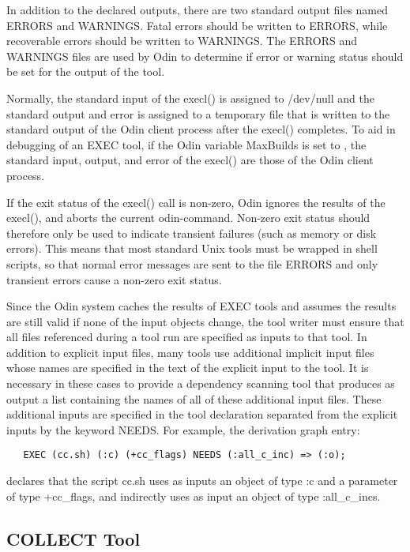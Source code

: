 In addition to the declared outputs,
there are two standard output files named {\ex ERRORS} and {\ex WARNINGS}.
Fatal errors should be written to {\ex ERRORS},
while recoverable errors should be written to {\ex WARNINGS}.
The {\ex ERRORS} and {\ex WARNINGS} files
are used by Odin to determine if error or warning status
should be set for the output of the tool.

Normally, the standard input of the {\ex execl()} is assigned to
{\ex /dev/null} and the standard output and error is assigned to
a temporary file that is written to the standard output of the
Odin client process after the {\ex execl()} completes.
To aid in debugging of an {\ex EXEC} tool,
if the Odin variable {\ex MaxBuilds} is set to {},
the standard input, output, and error of the {\ex execl()}
are those of the Odin client process.

If the exit status of the {\ex execl()} call is non-zero,
Odin ignores the results of the {\ex execl()},
and aborts the current odin-command.
Non-zero exit status should therefore only be used to indicate
transient failures (such as memory or disk errors).
This means that most standard Unix tools must be wrapped in shell scripts,
so that normal error messages are sent to the file {\ex ERRORS}
and only transient errors cause a non-zero exit status.

Since the Odin system caches the results of {\ex EXEC} tools
and assumes the results are still valid if none of the input objects change,
the tool writer must ensure that all files referenced during a tool run
are specified as inputs to that tool.
In addition to explicit input files,
many tools use additional implicit input files whose names are specified
in the text of the explicit input to the tool.
It is necessary in these cases to provide a dependency scanning tool
that produces as output a list containing the names of all of these
additional input files.
These additional inputs are specified in the tool declaration
separated from the explicit inputs by the keyword {\ex NEEDS}.
For example, the derivation graph entry:
\begin{verbatim}
   EXEC (cc.sh) (:c) (+cc_flags) NEEDS (:all_c_inc) => (:o);
\end{verbatim}
declares that the script {\ex cc.sh} uses as inputs an object of type {\ex :c}
and a parameter of type {\ex +cc\_flags},
and indirectly uses as input an object of type {\ex :all\_c\_incs}.

\subsection{COLLECT Tool}

